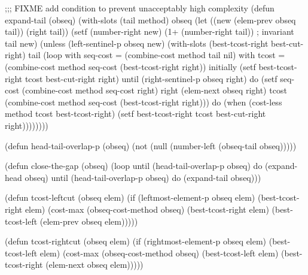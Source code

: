 ;;; FIXME add condition to prevent unacceptably high complexity
(defun expand-tail (obseq)
  (with-slots (tail method) obseq
    (let ((new (elem-prev obseq tail))
          (right tail))
      (setf (number-right new) (1+ (number-right tail)) ; invariant
            tail new)
      (unless (left-sentinel-p obseq new)
        (with-slots (best-tcost-right best-cut-right) tail
          (loop with seq-cost = (combine-cost method tail nil)
                with tcost = (combine-cost method seq-cost (best-tcost-right right))
                initially (setf best-tcost-right tcost
                                best-cut-right right)
                until (right-sentinel-p obseq right)
                do (setf seq-cost (combine-cost method seq-cost right)
                         right (elem-next obseq right)
                         tcost (combine-cost method seq-cost (best-tcost-right right)))
                do (when (cost-less method tcost best-tcost-right)
                     (setf best-tcost-right tcost
                           best-cut-right right))))))))

(defun head-tail-overlap-p (obseq)
  (not (null (number-left (obseq-tail obseq)))))

(defun close-the-gap (obseq)
  (loop until (head-tail-overlap-p obseq)
        do (expand-head obseq)
        until (head-tail-overlap-p obseq)
        do (expand-tail obseq)))

(defun tcost-leftcut (obseq elem)
  (if (leftmost-element-p obseq elem)
      (best-tcost-right elem)
      (cost-max (obseq-cost-method obseq)
                (best-tcost-right elem)
                (best-tcost-left (elem-prev obseq elem)))))

(defun tcost-rightcut (obseq elem)
  (if (rightmost-element-p obseq elem)
      (best-tcost-left elem)
      (cost-max (obseq-cost-method obseq)
                (best-tcost-left elem)
                (best-tcost-right (elem-next obseq elem)))))

